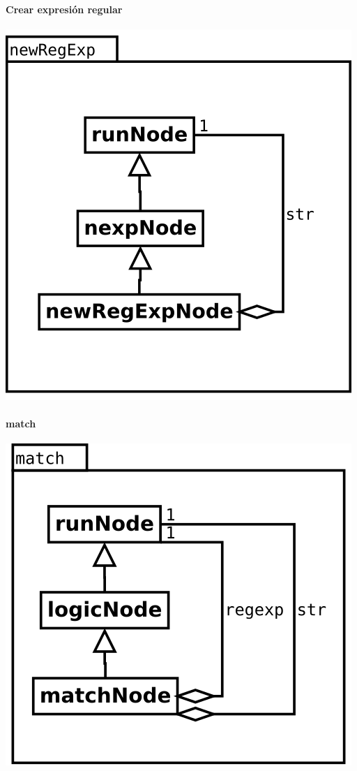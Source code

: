 \paragraph {Crear expresión regular}
\begin{center}
\includegraphics[scale=0.4]{newRegExp.png} \\
\end{center}

\paragraph {match}
\begin{center}
\includegraphics[scale=0.4]{match.png} \\
\end{center}


